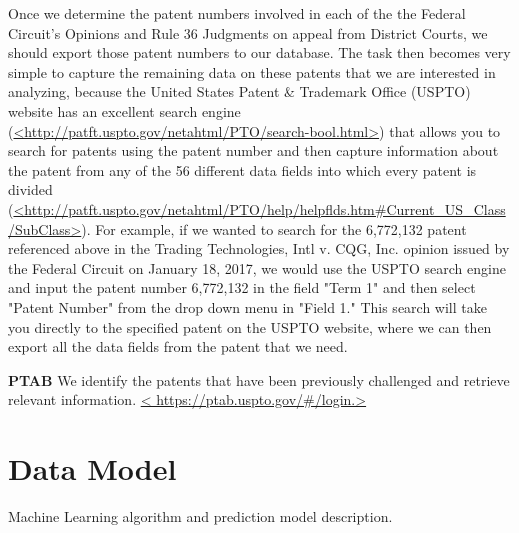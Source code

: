 \documentclass{article} %
\begin{document}
Once we determine the patent numbers involved in each of the the Federal Circuit's Opinions and Rule 36 Judgments on appeal from District Courts, we should export those patent numbers to our database.  The task then becomes very simple to capture the remaining data on these patents that we are interested in analyzing, because the United States Patent \& Trademark Office (USPTO) website has an excellent search engine (\url{<http://patft.uspto.gov/netahtml/PTO/search-bool.html>}) that allows you to search for patents using the patent number and then capture information about the patent from any of the 56 different data fields into which every patent is divided (\url{<http://patft.uspto.gov/netahtml/PTO/help/helpflds.htm#Current_US_Class/SubClass>}).  For example, if we wanted to search for the 6,772,132 patent referenced above in the Trading Technologies, Intl v. CQG, Inc. opinion issued by the Federal Circuit on January 18, 2017, we would use the USPTO search engine and input the patent number 6,772,132 in the field "Term 1" and then select "Patent Number" from the drop down menu in "Field 1."  This search will take you directly to the specified patent on the USPTO website, where we can then export all the data fields from the patent that we need.

\textbf{PTAB}
We identify the patents that have been previously challenged and retrieve relevant information. \url{< https://ptab.uspto.gov/#/login.>}

\pagebreak

\section{Data Model}
\vspace*{-1pt}
Machine Learning algorithm and prediction model description.
\end{document}
